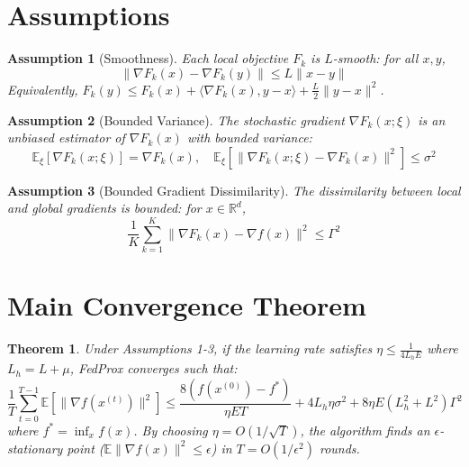 \documentclass{article}
\newtheorem{theorem}{Theorem}
\newtheorem{assumption}{Assumption}
\begin{document}
\newpage
\section*{Assumptions}
\begin{assumption}[Smoothness]
Each local objective $F_k$ is $L$-smooth: for all $x, y$,
$$ \|\nabla F_k(x) - \nabla F_k(y)\| \leq L \|x - y\| $$
Equivalently, $F_k(y) \leq F_k(x) + \langle \nabla F_k(x), y - x \rangle + \frac{L}{2} \|y - x\|^2$.
\end{assumption}

\begin{assumption}[Bounded Variance]
The stochastic gradient $\nabla F_k(x; \xi)$ is an unbiased estimator of $\nabla F_k(x)$ with bounded variance:
$$ \mathbb{E}_{\xi}[\nabla F_k(x; \xi)] = \nabla F_k(x), \quad \mathbb{E}_{\xi}[\|\nabla F_k(x; \xi) - \nabla F_k(x)\|^2] \leq \sigma^2 $$
\end{assumption}

\begin{assumption}[Bounded Gradient Dissimilarity]
The dissimilarity between local and global gradients is bounded: for $x \in \mathbb{R}^d$,
$$ \frac{1}{K} \sum_{k=1}^K \|\nabla F_k(x) - \nabla f(x)\|^2 \leq \Gamma^2 $$
\end{assumption}

\section*{Main Convergence Theorem}
\begin{theorem}
Under Assumptions 1-3, if the learning rate satisfies $\eta \leq \frac{1}{4L_h E}$ where $L_h = L + \mu$, FedProx converges such that:
$$ \frac{1}{T} \sum_{t=0}^{T-1} \mathbb{E}[\|\nabla f(x^{(t)})\|^2] \leq \frac{8(f(x^{(0)}) - f^*)}{\eta E T} + 4L_h \eta \sigma^2 + 8\eta E (L_h^2 + L^2) \Gamma^2 $$
where $f^* = \inf_x f(x)$. By choosing $\eta = O(1/\sqrt{T})$, the algorithm finds an $\epsilon$-stationary point ($\mathbb{E}\|\nabla f(x)\|^2 \leq \epsilon$) in $T = O(1/\epsilon^2)$ rounds.
\end{theorem}
\end{document}
